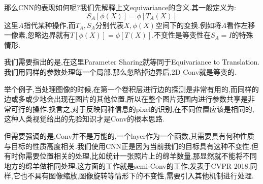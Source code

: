 那么CNN的表现如何呢?我们先解释上文equivariance的含义.其一般定义为:
\begin{equation}
	S_A[\phi(X)] = \phi[T_A(X)]
\end{equation}
这里$A$指代某种操作,而$T_A, S_A$分别代表$X,\phi(X)$空间下的变换.例如将$A$看作左移一像素,忽略边界就有$T[\phi(X)] = \phi[T(X)]$.不变性是等变性在$S_A = I$的特殊情形.

我们需要指出的是,在这里Parameter Sharing就等同于Equivariance to Translation.我们用同样的参数处理每一个局部,那么忽略掉边界后,2D Conv就是等变的.

举个例子,当处理图像的时候,在第一个卷积层进行边的探测是非常有用的,而同样的边或多或少地会出现在图片的其他位置,所以在整个图片范围内进行参数共享是非常可行的操作.换言之,对于反映同种信息的pixel的识别,在不同位置应该是相同的,这种人类视觉给出的先验知识才是Conv的根本思路.

但需要强调的是,Conv并不是万能的,一个layer作为一个函数,其需要具有何种性质与目标的性质高度相关.我们使用CNN正是因为当前我们的目标具有这种不变性.但有时你需要位置相关的处理,比如统计一张照片上的绵羊数量,那显然就不能将不同地方的绵羊做相同处理.这方面的工作就是semi-Conv的工作,发表于CVPR 2018.同样,它也不具有图像缩放,图像旋转等情形下的不变性,需要引入其他机制进行处理.